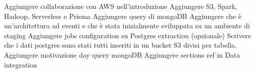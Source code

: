 Aggiungere collaborazione con AWS nell'introduzione
Aggiungere S3, Spark, Hadoop, Serverless e Prisma
Aggiungere query di mongoDB
Aggiungere che è un'architettura ad eventi e che è stata inizialmente sviluppata su un ambiente di staging
Aggiungere jobs configuration su Postgres extraction (opzionale)
Scrivere che i dati postgres sono stati tutti inseriti in un bucket S3 divisi per tabella.
Aggiungere motivazione day query mongoDB
Aggiungere sections ref in Data integration